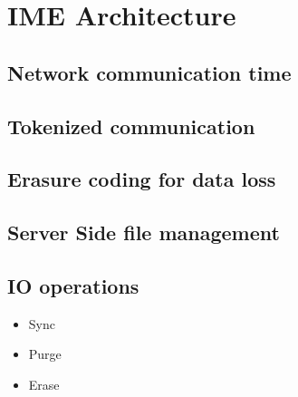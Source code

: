 
\section{IME Architecture}
\subsection{Network communication time}
\subsection{Tokenized communication}
\subsection{Erasure coding for data loss}
\subsection{Server Side file management}
\subsection{IO operations}
\begin{itemize}
    \item Sync
    \item Purge
    \item Erase
\end{itemize}
